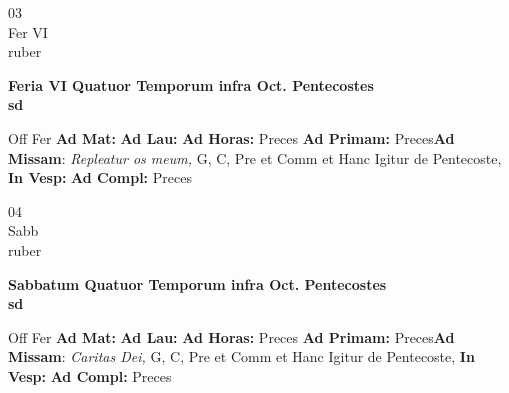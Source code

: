 \documentclass[10pt, openany]{book}
\begin{document}
    \begin{center}
        \begin{minipage}{3.5in}
            \vspace{2em}
            \begin{minipage}{0.5in}
                {\Huge 03} \\
                {\normalsize Fer VI} \\
                {\normalsize ruber}
            \end{minipage}
            \begin{minipage}{3.0in}
                \textbf{ \large Feria VI Quatuor Temporum infra Oct. Pentecostes \\
                \textnormal{\normalsize sd}} \\ 
            \end{minipage}
            \begin{justify}Off Fer
                \textbf{Ad Mat: }
                \textbf{Ad Lau: }
                \textbf{Ad Horas: }Preces
                \textbf{Ad Primam: }Preces\textbf{Ad Missam}: \textit{Repleatur os meum,} G, C, Pre et Comm et Hanc Igitur de Pentecoste,  
                \textbf{In Vesp: }
                \textbf{Ad Compl: }Preces
            \end{justify}
        \end{minipage}
    \end{center}

    \begin{center}
        \begin{minipage}{3.5in}
            \vspace{2em}
            \begin{minipage}{0.5in}
                {\Huge 04} \\
                {\normalsize Sabb} \\
                {\normalsize ruber}
            \end{minipage}
            \begin{minipage}{3.0in}
                \textbf{ \large Sabbatum Quatuor Temporum infra Oct. Pentecostes \\
                \textnormal{\normalsize sd}} \\ 
            \end{minipage}
            \begin{justify}Off Fer
                \textbf{Ad Mat: }
                \textbf{Ad Lau: }
                \textbf{Ad Horas: }Preces
                \textbf{Ad Primam: }Preces\textbf{Ad Missam}: \textit{Caritas Dei,} G, C, Pre et Comm et Hanc Igitur de Pentecoste,  
                \textbf{In Vesp: }
                \textbf{Ad Compl: }Preces
            \end{justify}
        \end{minipage}
    \end{center}
\end{document}
